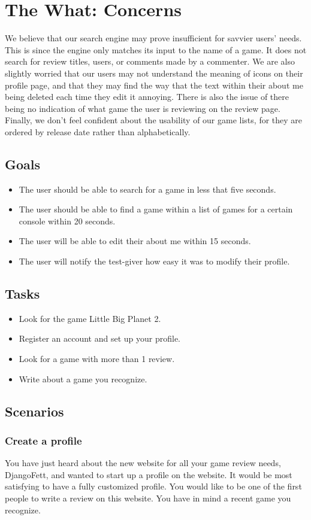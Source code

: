 \documentclass[11pt]{extarticle}
\begin{document}
\section*{The What: Concerns}
We believe that our search engine may prove insufficient for savvier users' needs. This is since the engine
only matches its input to the name of a game. It does not search for review titles, users, or comments made by
a commenter. We are also slightly worried that our users may not understand the meaning of icons on their profile
page, and that they may find the way that the text within their about me being deleted each time they edit
it annoying. There is also the issue of there being no indication of what game the user is reviewing on the
review page. Finally, we don't feel confident about the usability of our game lists, for they are ordered
by release date rather than alphabetically.
\subsection*{Goals}
   \begin{itemize}
   \item The user should be able to search for a game in less that five seconds.
   \item The user should be able to find a game within a list of games for a certain console within 20 seconds.
   \item The user will be able to edit their about me within 15 seconds.
   \item The user will notify the test-giver how easy it was to modify their profile.
   \end{itemize}
\subsection*{Tasks}
   \begin{itemize}
   \item Look for the game Little Big Planet 2.
   \item Register an account and set up your profile.
   \item Look for a  game with more than 1 review.
   \item Write about a game you recognize.
   \end{itemize}
\subsection*{Scenarios}
   \subsubsection*{Create a profile}
      You have just heard about the new website for all your game review needs, DjangoFett, and wanted
      to start up a profile on the website. It would be most satisfying to have a fully customized profile.
      You would like to be one of the first people to write a review on this
      website. You have in mind a recent game you recognize.
\end{document}

